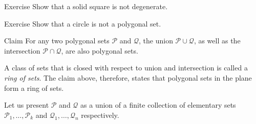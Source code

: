 \begin{thm}{Exercise}\label{ex:solid-square}
Show that a solid square is not degenerate.
\end{thm}

\begin{thm}{Exercise}\label{ex:poly-circ}
Show that a circle is not a polygonal set.
\end{thm}

\begin{thm}{Claim}\label{clm:poly-ring}
For any two polygonal sets $\mathcal{P}$ and $\mathcal{Q}$,
the union $\mathcal{P}\cup\mathcal{Q}$, 
as well as the intersection $\mathcal{P}\cap\mathcal{Q}$, 
are also polygonal sets.
\end{thm}

A class of sets that is closed with respect to union and intersection  is called a {}\emph{ring of sets}.
The claim above, therefore, states that polygonal sets in the plane form a ring of sets.

Let us present $\mathcal{P}$ and $\mathcal{Q}$
as a union of a finite collection of elementary sets $\mathcal{P}_1,\dots,\mathcal{P}_k$ 
and $\mathcal{Q}_1,\dots,\mathcal{Q}_n$ respectively.


